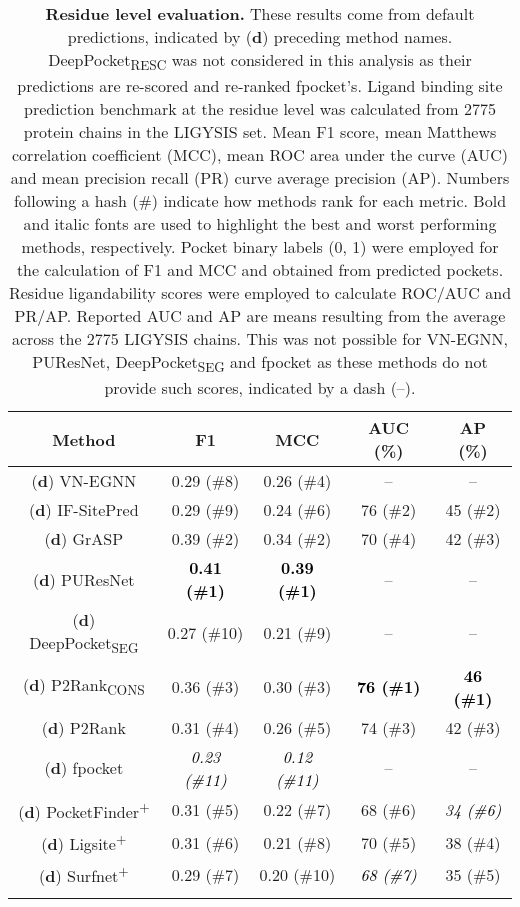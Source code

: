 \begin{longtable}[c]{|c|c|c|c|c|}
\hline
\textbf{Method}         & \textbf{F1}   & \textbf{MCC}  & \textbf{AUC} (\%)  & \textbf{AP} (\%)   \\ \hline
\endfirsthead
%
\footnotesize{(\textbf{d})} VN-EGNN        & 0.29 (\#8) & 0.26 (\#4) & --    & --    \\ \hline
\footnotesize{(\textbf{d})} IF-SitePred    & 0.29 (\#9) & 0.24 (\#6) & 76 (\#2)  & 45 (\#2) \\ \hline
\footnotesize{(\textbf{d})} GrASP          & 0.39 (\#2) & 0.34 (\#2) & 70 (\#4) & 42 (\#3) \\ \hline
\footnotesize{(\textbf{d})} PUResNet       & \textbf{\textcolor{black}{0.41 (\#1)}} & \textbf{\textcolor{black}{0.39 (\#1)}} & --    & --    \\ \hline
\footnotesize{(\textbf{d})} DeepPocket\textsubscript{SEG}  & 0.27 (\#10) & 0.21 (\#9) & --    & --    \\ \hline
\footnotesize{(\textbf{d})} P2Rank\textsubscript{CONS}     & 0.36 (\#3) & 0.30 (\#3)  & \textbf{\textcolor{black}{76 (\#1)}} & \textbf{\textcolor{black}{46 (\#1)}} \\ \hline
\footnotesize{(\textbf{d})} P2Rank         & 0.31 (\#4) & 0.26 (\#5) & 74 (\#3) & 42 (\#3) \\ \hline
\footnotesize{(\textbf{d})} fpocket        & \textit{\textcolor{black}{0.23 (\#11)}} & \textit{\textcolor{black}{0.12 (\#11)}} & --    & --    \\ \hline
\footnotesize{(\textbf{d})} PocketFinder\textsuperscript{+}  & 0.31 (\#5) & 0.22 (\#7) & 68 (\#6) & \textit{\textcolor{black}{34 (\#6)}} \\ \hline
\footnotesize{(\textbf{d})} Ligsite\textsuperscript{+}       & 0.31 (\#6) & 0.21 (\#8) & 70 (\#5) & 38 (\#4) \\ \hline
\footnotesize{(\textbf{d})} Surfnet\textsuperscript{+}       & 0.29 (\#7) & 0.20 (\#10)  & \textit{\textcolor{black}{68 (\#7)}} & 35 (\#5) \\ \hline
\caption[Residue level evaluation]{\textbf{Residue level evaluation.} These results come from default predictions, indicated by (\textbf{d}) preceding method names. DeepPocket\textsubscript{RESC} was not considered in this analysis as their predictions are re-scored and re-ranked fpocket's. Ligand binding site prediction benchmark at the residue level was calculated from 2775 protein chains in the LIGYSIS set. Mean F1 score, mean Matthews correlation coefficient (MCC), mean ROC area under the curve (AUC) and mean precision recall (PR) curve average precision (AP). Numbers following a hash (\#) indicate how methods rank for each metric. Bold and italic fonts are used to highlight the best and worst performing methods, respectively. Pocket binary labels (0, 1) were employed for the calculation of F1 and MCC and obtained from predicted pockets. Residue ligandability scores were employed to calculate ROC/AUC and PR/AP. Reported AUC and AP are means resulting from the average across the 2775 LIGYSIS chains. This was not possible for VN-EGNN, PUResNet, DeepPocket\textsubscript{SEG} and fpocket as these methods do not provide such scores, indicated by a dash (--).}

\end{longtable}
